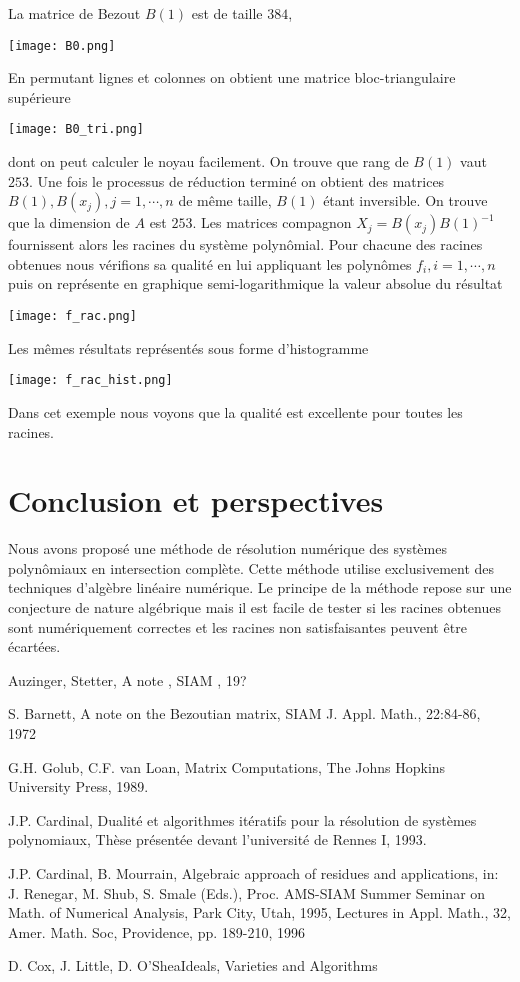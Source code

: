 \documentclass{article}
\theoremstyle{plain}%
\theoremstyle{definition}
\theoremstyle{remark}
\begin{document}
La matrice de Bezout $B(1)$ est de taille $384$,
 \begin{center}
\texttt{[image: B0.png]}
\end{center}


En permutant lignes et colonnes on obtient une matrice bloc-triangulaire supérieure
 \begin{center}
\texttt{[image: B0\_tri.png]}
\end{center}
dont on peut calculer le noyau facilement. On trouve que rang de $B(1)$ vaut $253$. 
Une fois le processus de réduction terminé on obtient des matrices $B(1), B(x_j), j=1,\cdots,n$ de même taille, $B(1)$ étant inversible. On trouve que la dimension de $A$ est $253$. Les matrices compagnon $X_j = B(x_j)B(1)^{-1}$ fournissent alors les racines du système polynômial. Pour chacune des racines obtenues nous vérifions sa qualité en lui appliquant les polynômes $f_i, i=1,\cdots,n$ puis on représente en graphique semi-logarithmique la  valeur absolue du résultat
 \begin{center}
\texttt{[image: f\_rac.png]}
\end{center}
Les mêmes résultats représentés sous forme d'histogramme
 \begin{center}
\texttt{[image: f\_rac\_hist.png]}
\end{center}

Dans cet exemple nous voyons que la qualité est excellente pour toutes les racines.
\section{Conclusion et perspectives}
Nous avons proposé une méthode de résolution numérique des systèmes polynômiaux en intersection complète. Cette méthode utilise exclusivement des techniques d'algèbre linéaire numérique. Le principe de la méthode repose sur une conjecture de nature algébrique mais il est facile de tester si les racines obtenues sont numériquement correctes et les racines non satisfaisantes peuvent être écartées.

\begin{thebibliography}{00}

{Auzinger, Stetter}, {A note }, {SIAM }, {19?}

{S. Barnett}, {A note on the Bezoutian matrix}, {SIAM J. Appl. Math., 22:84-86}, {1972}
		
{G.H. Golub, C.F. van Loan}, {Matrix Computations}, {The Johns Hopkins University Press}, {1989}.

{J.P. Cardinal}, {Dualité et algorithmes itératifs pour la résolution de systèmes polynomiaux}, {Thèse présentée devant l'université de Rennes I}, {1993}.

{J.P. Cardinal, B. Mourrain}, {Algebraic approach of residues and applications}, {in: J. Renegar, M. Shub, S. Smale (Eds.), Proc. AMS-SIAM Summer Seminar on Math. of Numerical Analysis, Park City, Utah, 1995, Lectures in Appl. Math., 32, Amer. Math. Soc, Providence, pp. 189-210}, {1996}

{D. Cox, J. Little, D. O'Shea}{Ideals, Varieties and Algorithms}
\end{thebibliography}
\end{document}
